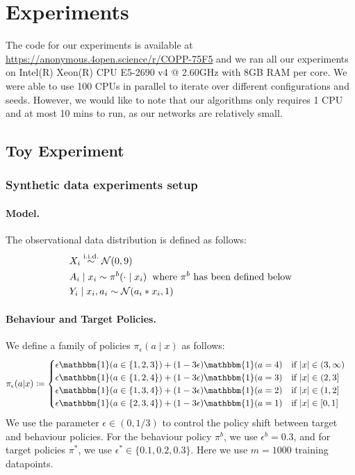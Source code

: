 \newpage
\section{Experiments}\label{sec:exps_app}
The code for our experiments is available at \url{https://anonymous.4open.science/r/COPP-75F5} and we ran all our experiments on Intel(R) Xeon(R) CPU E5-2690 v4 @ 2.60GHz with 8GB RAM per core. We were able to use 100 CPUs in parallel to iterate over different configurations and seeds. However, we would like to note that our algorithms only requires 1 CPU and at most 10 mins to run, as our networks are relatively small.
\subsection{Toy Experiment}\label{sec:toy_experiments_descrip}
\subsubsection{Synthetic data experiments setup}
\paragraph{Model.}
The observational data distribution is defined as follows:
\begin{align}
    & X_i \overset{\textup{i.i.d.}}{\sim} \mathcal{N}(0,9) \nonumber \\
    & A_i \mid x_i \sim \pi^b(\cdot \mid x_i) \hspace{0.2cm} \textup{where $\pi^b$ has been defined below} \nonumber \\
    & Y_i \mid x_i, a_i \sim \mathcal{N}(a_i * x_i, 1) \nonumber
\end{align}

\paragraph{Behaviour and Target Policies.}
We define a family of policies $\pi_\epsilon(a \mid x)$ as follows:
\begin{align}
&\pi_\epsilon(a|x) \coloneqq
     \begin{cases}
          \epsilon\mathbbm{1}(a \in \{1,2,3\}) + (1-3\epsilon)\mathbbm{1}(a=4) &  \textup{if } |x|\in (3, \infty)\\
          \epsilon\mathbbm{1}(a \in \{1,2,4\}) + (1-3\epsilon)\mathbbm{1}(a=3) & \textup{if } |x|\in (2, 3]\\
          \epsilon\mathbbm{1}(a \in \{1,3,4\}) + (1-3\epsilon)\mathbbm{1}(a=2) & \textup{if } |x|\in (1, 2]\\
          \epsilon\mathbbm{1}(a \in \{2,3,4\}) + (1-3\epsilon)\mathbbm{1}(a=1) & \textup{if } |x|\in [0, 1]\\
          \end{cases} \nonumber
\end{align}
We use the parameter $\epsilon \in (0,1/3)$ to control the policy shift between target and behaviour policies. For the behaviour policy $\pi^b$, we use $\epsilon^b = 0.3$, and for target policies $\pi^*$, we use $\epsilon^* \in \{0.1, 0.2, 0.3\}$. Here we use $m=1000$ training datapoints.

